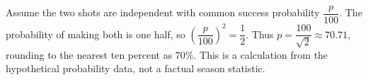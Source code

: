 Assume the two shots are independent with common success probability $\dfrac{p}{100}$. The probability of making both is one half, so $(\dfrac{p}{100})^2=\dfrac{1}{2}$. Thus $p=\dfrac{100}{\sqrt2}\approx70.71$, rounding to the nearest ten percent as $\boxed{70\%}$. This is a calculation from the hypothetical probability data, not a factual season statistic.
